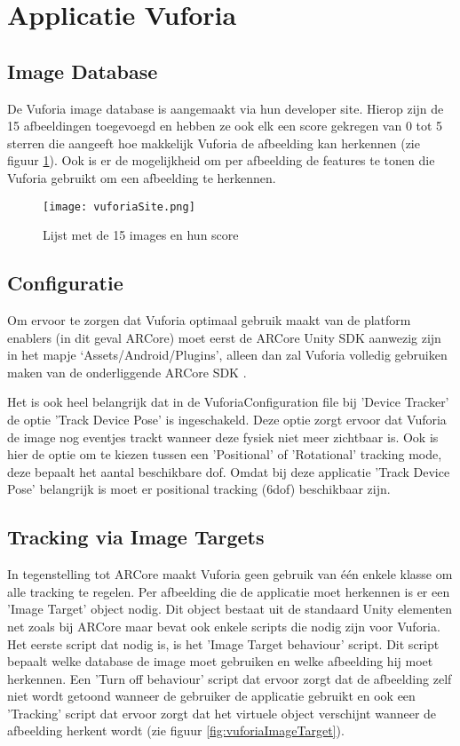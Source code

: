 \section{Applicatie Vuforia}

\subsection{Image Database}
De Vuforia image database is aangemaakt via hun developer site. Hierop zijn de 15 afbeeldingen toegevoegd en hebben ze ook elk een score gekregen van 0 tot 5 sterren die aangeeft hoe makkelijk Vuforia de afbeelding kan herkennen (zie figuur \ref{fig:vuforiaDatabase}). Ook is er de mogelijkheid om per afbeelding de features te tonen die Vuforia gebruikt om een afbeelding te herkennen.

\begin{figure}
    \texttt{[image: vuforiaSite.png]}
    \caption{Lijst met de 15 images en hun score}
    \label{fig:vuforiaDatabase}
\end{figure}

\subsection{Configuratie}
Om ervoor te zorgen dat Vuforia optimaal gebruik maakt van de platform enablers (in dit geval ARCore) moet eerst de ARCore Unity SDK aanwezig zijn in het mapje `Assets/Android/Plugins', alleen dan zal Vuforia volledig gebruiken maken van de onderliggende ARCore SDK \autocite{VuforiaARCore}.

Het is ook heel belangrijk dat in de VuforiaConfiguration file bij 'Device Tracker' de optie 'Track Device Pose' is ingeschakeld. Deze optie zorgt ervoor dat Vuforia de image nog eventjes trackt wanneer deze fysiek niet meer zichtbaar is. Ook is hier de optie om te kiezen tussen een 'Positional' of 'Rotational' tracking mode, deze bepaalt het aantal beschikbare \acrlong{dof}. Omdat bij deze applicatie 'Track Device Pose' belangrijk is moet er positional tracking (\acrshort{6dof}) beschikbaar zijn.

\subsection{Tracking via Image Targets}
In tegenstelling tot ARCore maakt Vuforia geen gebruik van één enkele klasse om alle tracking te regelen. Per afbeelding die de applicatie moet herkennen is er een 'Image Target' object nodig. Dit object bestaat uit de standaard Unity elementen net zoals bij ARCore maar bevat ook enkele scripts die nodig zijn voor Vuforia. Het eerste script dat nodig is, is het 'Image Target behaviour' script. Dit script bepaalt welke database de image moet gebruiken en welke afbeelding hij moet herkennen. Een 'Turn off behaviour' script dat ervoor zorgt dat de afbeelding zelf niet wordt getoond wanneer de gebruiker de applicatie gebruikt en ook een 'Tracking' script dat ervoor zorgt dat het virtuele object verschijnt wanneer de afbeelding herkent wordt (zie figuur \ref{fig:vuforiaImageTarget}). 

